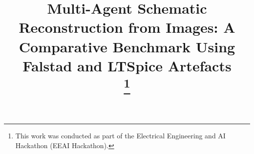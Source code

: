 \title{Multi-Agent Schematic Reconstruction from Images: A Comparative Benchmark Using Falstad and LTSpice Artefacts\\
\thanks{This work was conducted as part of the Electrical Engineering and AI Hackathon (EEAI Hackathon).}}
